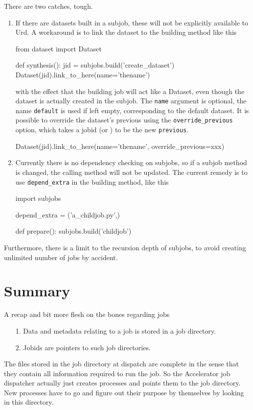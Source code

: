 There are two catches, tough.
\begin{enumerate}
  \item
If there are datasets built in a subjob,
these will not be explicitly available to Urd.  A workaround is to
link the dataset to the building method like this
\begin{python}
from dataset import Dataset

def synthesis():
    jid = subjobs.build('create_dataset')
    Dataset(jid).link_to_here(name='thename')
\end{python}
with the effect that the building job will act like a Dataset, even
though the dataset is actually created in the subjob.  The
\texttt{name} argument is optional, the name \texttt{default} is used
if left empty, corresponding to the default dataset.  It is possible
to override the dataset's previous using
the \texttt{override\_previous} option, which takes a jobid
(or \pyNone) to be the new \texttt{previous}.
\begin{python}
Dataset(jid).link_to_here(name='thename', override_previous=xxx)
\end{python}


\item
Currently there is no dependency checking on subjobs, so if a subjob
method is changed, the calling method will not be updated.  The
current remedy is to use \texttt{depend\_extra} in the building
method, like this
\begin{python}
import subjobs

depend_extra = ('a_childjob.py',)

def prepare():
  subjobs.build('childjob')
\end{python}
\end{enumerate}
Furthermore, there is a limit to the recursion depth of subjobs, to
avoid creating unlimited number of jobs by accident.



\section{Summary}
A recap and bit more flesh on the bones regarding jobs
\begin{itemize}
\item[1.]  Data and metadata relating to a job is stored in a job directory.
\item[2.]  Jobids are pointers to such job directories.
\end{itemize}
The files stored in the job directory at dispatch are complete in the
sense that they contain all information required to run the job.  So
the Accelerator job dispatcher actually just creates processes and
points them to the job directory.  New processes have to go and figure
out their purpose by themselves by looking in this directory.

